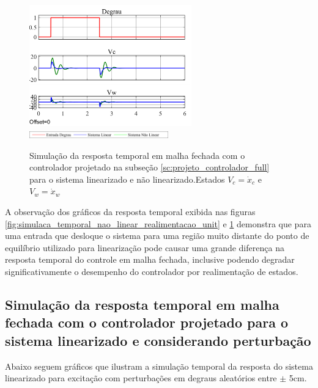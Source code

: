 \documentclass[a4paper]{ifacconf}
\begin{document}
	\FloatBarrier
    \begin{figure}[htbp]
        \begin{centering}
            \includegraphics[width=7cm]{img/simulaca_temporal_nao_linear_realimentacao_unit_V.png}
            \includegraphics[width=6cm]{img/sim_nao_linear_simulink_temp_leg.png}
            \caption{Simulação da resposta temporal em malha fechada com o controlador projetado na subseção \ref{sc:projeto_controlador_full} para o sistema linearizado e não linearizado.Estados $V_c = \dot{x}_c$ e $V_w = \dot{x}_w$ }
            \label{fig:simulaca_temporal_nao_linear_realimentacao_unit_V}
        \end{centering}
    \end{figure}
    \FloatBarrier
    
    A observação dos gráficos da resposta temporal exibida nas figuras \ref{fig:simulaca_temporal_nao_linear_realimentacao_unit} e \ref{fig:simulaca_temporal_nao_linear_realimentacao_unit_V} demonstra que para uma entrada que desloque o sistema para uma região muito distante do ponto de equilíbrio utilizado para linearização pode causar uma grande diferença na resposta temporal do controle em malha fechada, inclusive podendo degradar significativamente o desempenho do controlador por realimentação de estados. 

 \subsection{Simulação da resposta temporal em malha fechada com o controlador projetado para o sistema linearizado e considerando perturbação}
 
Abaixo seguem gráficos que ilustram a simulação temporal da resposta do sistema linearizado para excitação com perturbações em degraus aleatórios entre $\pm$ 5cm.
\end{document}
